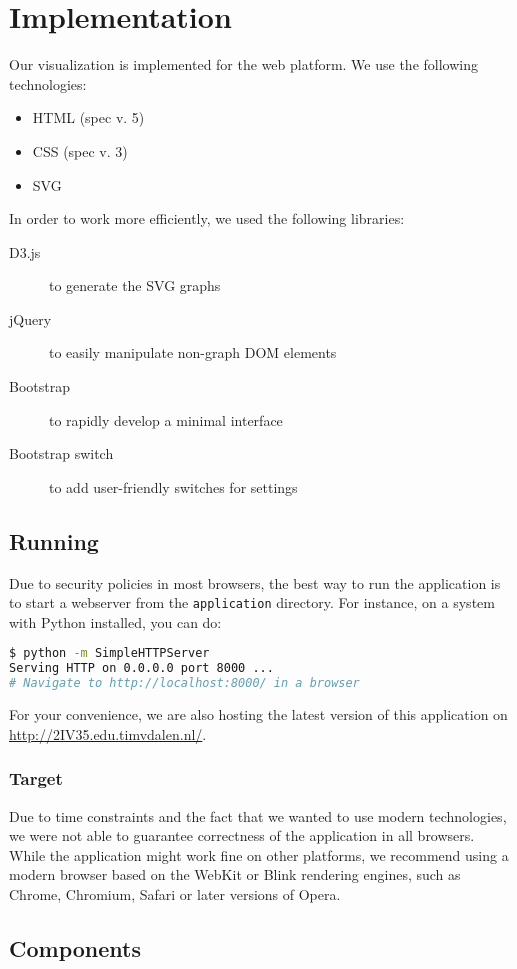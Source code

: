 \section{Implementation}\label{sec:imp}

	Our visualization is implemented for the web platform.
	We use the following technologies:

	\begin{itemize}
		\item HTML (spec v. 5)
		\item CSS (spec v. 3)
		\item SVG
	\end{itemize}

	In order to work more efficiently, we used the following libraries:

	\begin{description}
		\item[D3.js] to generate the SVG graphs
		\item[jQuery] to easily manipulate non-graph DOM elements
		\item[Bootstrap] to rapidly develop a minimal interface
		\item[Bootstrap switch] to add user-friendly switches for settings
	\end{description}

	\subsection{Running}
		Due to security policies in most browsers, the best way to run the application is to start a webserver from the \texttt{application} directory.
		For instance, on a system with Python installed, you can do:

		\begin{lstlisting}[language=bash]
$ python -m SimpleHTTPServer
Serving HTTP on 0.0.0.0 port 8000 ...
# Navigate to http://localhost:8000/ in a browser
		\end{lstlisting}

		For your convenience, we are also hosting the latest version of this application on \url{http://2IV35.edu.timvdalen.nl/}.

		\subsubsection{Target}
			Due to time constraints and the fact that we wanted to use modern technologies, we were not able to guarantee correctness of the application in all browsers.
			While the application might work fine on other platforms, we recommend using a modern browser based on the WebKit or Blink rendering engines, such as Chrome, Chromium, Safari or later versions of Opera.

	\subsection{Components}
